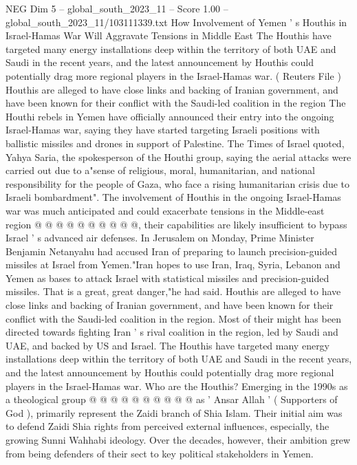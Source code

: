 \begin{textsample}{NEG Dim 5 – global\_south\_2023\_11 – Score 1.00 – global\_south\_2023\_11/103111339.txt}  \label{ex:f5_neg_175}
How Involvement of Yemen ' s Houthis in Israel-Hamas War Will Aggravate Tensions in Middle East The Houthis have targeted many energy installations deep within the territory of both UAE and Saudi in the recent years, and the latest announcement by Houthis could potentially drag more regional players in the Israel-Hamas war. ( Reuters File ) Houthis are alleged to have close links and backing of Iranian government, and have been known for their conflict with the Saudi-led coalition in the region The Houthi rebels in Yemen have officially announced their entry into the ongoing Israel-Hamas war, saying they have started targeting Israeli positions with ballistic missiles and drones in support of Palestine.
The Times of Israel quoted, Yahya Saria, the spokesperson of the Houthi group, saying the aerial attacks were carried out due to a"sense of religious, moral, humanitarian, and national responsibility for the people of Gaza, who face a rising humanitarian crisis due to Israeli bombardment".
The involvement of Houthis in the ongoing Israel-Hamas war was much anticipated and could exacerbate tensions in the Middle-east region @ @ @ @ @ @ @ @ @ @, their capabilities are likely insufficient to bypass Israel ' s advanced air defenses.
In Jerusalem on Monday, Prime Minister Benjamin Netanyahu had accused Iran of preparing to launch precision-guided missiles at Israel from Yemen."Iran hopes to use Iran, Iraq, Syria, Lebanon and Yemen as bases to attack Israel with statistical missiles and precision-guided missiles.
That is a great, great danger,"he had said.
Houthis are alleged to have close links and backing of Iranian government, and have been known for their conflict with the Saudi-led coalition in the region.
Most of their might has been directed towards fighting Iran ' s rival coalition in the region, led by Saudi and UAE, and backed by US and Israel.
The Houthis have targeted many energy installations deep within the territory of both UAE and Saudi in the recent years, and the latest announcement by Houthis could potentially drag more regional players in the Israel-Hamas war.
Who are the Houthis?
Emerging in the 1990s as a theological group @ @ @ @ @ @ @ @ @ @ as ' Ansar Allah ' ( Supporters of God ), primarily represent the Zaidi branch of Shia Islam.
Their initial aim was to defend Zaidi Shia rights from perceived external influences, especially, the growing Sunni Wahhabi ideology.
Over the decades, however, their ambition grew from being defenders of their sect to key political stakeholders in Yemen.

\end{textsample}
